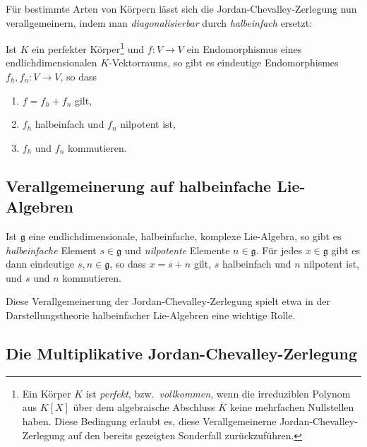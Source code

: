 Für bestimmte Arten von Körpern lässt sich die Jordan-Chevalley-Zerlegung nun verallgemeinern, indem man \emph{diagonalisierbar} durch \emph{halbeinfach} ersetzt:

\begin{theorem}
  \label{theorem: general Jordan-Chevalley decomposition}
  Ist $K$ ein perfekter Körper\footnote{
  Ein Körper $K$ ist \emph{perfekt}, bzw.\ \emph{vollkommen}, wenn die irreduziblen Polynom aus $K[X]$ über dem algebraische Abschluss $\overline{K}$ keine mehrfachen Nullstellen haben. 
  Diese Bedingung erlaubt es, diese Verallgemeinerne Jordan-Chevalley-Zerlegung auf den bereits gezeigten Sonderfall zurückzuführen.}
  und $f \colon V \to V$ ein Endomorphismus eines endlichdimensionalen $K$-Vektorraums, so gibt es eindeutige Endomorphismes $f_h, f_n \colon V \to V$, so dass
  \begin{enumerate}
    \item
      $f = f_h + f_n$ gilt,
    \item
      $f_h$ halbeinfach und $f_n$ nilpotent ist,
    \item
      $f_h$ und $f_n$ kommutieren.
  \end{enumerate}
\end{theorem}





\subsection*{Verallgemeinerung auf halbeinfache Lie-Algebren}

Ist $\mathfrak{g}$ eine endlichdimensionale, halbeinfache, komplexe Lie-Algebra, so gibt es \emph{halbeinfache} Element $s \in \mathfrak{g}$ und \emph{nilpotente} Elemente $n \in \mathfrak{g}$.
Für jedes $x \in \mathfrak{g}$ gibt es dann eindeutige $s, n \in \mathfrak{g}$, so dass $x = s + n$ gilt, $s$ halbeinfach und $n$ nilpotent ist, und $s$ und $n$ kommutieren.

Diese Verallgemeinerung der Jordan-Chevalley-Zerlegung spielt etwa in der Darstellungstheorie halbeinfacher Lie-Algebren eine wichtige Rolle.



\subsection*{Die Multiplikative Jordan-Chevalley-Zerlegung}

